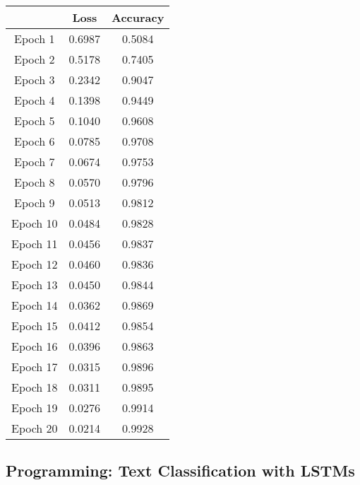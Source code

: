\documentclass[12pt]{article}
\begin{document}
\begin{enumerate}
{\begin{center}
\begin{tabular}{||c c c ||} 
 \hline
       & Loss & Accuracy \\ [0.5ex] 
 \hline\hline
 Epoch 1  & 0.6987 & 0.5084 \\ 
 \hline
 Epoch 2 & 0.5178 & 0.7405\\
 \hline
 Epoch 3   & 0.2342   & 0.9047\\
 \hline
 Epoch 4  & 0.1398  & 0.9449\\
 \hline
 Epoch 5  & 0.1040 & 0.9608\\ 
 \hline
 Epoch 6 & 0.0785 & 0.9708\\
 \hline
 Epoch 7  & 0.0674   & 0.9753 \\
 \hline
 Epoch 8  & 0.0570 & 0.9796\\
 \hline
 Epoch 9  & 0.0513  & 0.9812 \\ 
 \hline
 Epoch 10 & 0.0484 & 0.9828  \\
 \hline
 Epoch 11   & 0.0456  & 0.9837  \\
 \hline
 Epoch 12  & 0.0460 & 0.9836\\
 \hline
 Epoch 13  & 0.0450  & 0.9844  \\
 \hline
 Epoch 14 & 0.0362 & 0.9869\\ 
 \hline
 Epoch 15 & 0.0412 & 0.9854  \\
 \hline
 Epoch 16   & 0.0396  & 0.9863  \\
 \hline
 Epoch 17  & 0.0315  & 0.9896  \\
 \hline
 Epoch 18  & 0.0311 & 0.9895\\
 \hline
 Epoch 19  & 0.0276 & 0.9914 \\
 \hline
  Epoch 20  & 0.0214  & 0.9928  \\
 \hline

\end{tabular}
\end{center}
}



\end{enumerate}


\subsection{Programming: Text Classification with LSTMs}
\end{document}
